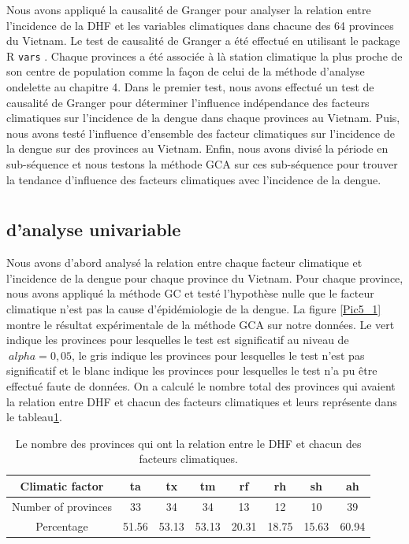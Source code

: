 Nous avons appliqué la causalité de Granger pour analyser la relation entre l'incidence de la DHF et les variables climatiques dans chacune des 64 provinces du Vietnam. Le test de causalité de Granger a été effectué en utilisant le package R \texttt{vars}  \cite{pfaff2013package}. Chaque provinces a été associée à là station climatique la plus proche de son centre de population comme la façon de celui de la méthode d'analyse ondelette au chapitre 4. Dans le premier test, nous avons effectué un test de causalité de Granger pour déterminer l'influence indépendance des facteurs climatiques sur l'incidence de la dengue dans chaque provinces au Vietnam. Puis, nous avons testé l'influence d'ensemble des facteur climatiques sur l'incidence de la dengue sur des provinces au Vietnam. Enfin, nous avons divisé la période en sub-séquence et nous testons la méthode GCA sur ces sub-séquence pour trouver la tendance d'influence des facteurs climatiques avec l'incidence de la dengue. 

\section{\Rs}

\subsection{\Rs d'analyse univariable}
Nous avons d'abord analysé la relation entre chaque facteur climatique et l'incidence de la dengue pour chaque province du Vietnam. Pour chaque province, nous avons appliqué la méthode GC et testé l'hypothèse nulle que le facteur climatique n'est pas la cause d'épidémiologie de la dengue. La figure \ref{Pic5_1} montre le résultat expérimentale de la méthode GCA sur notre données. Le vert indique les provinces pour lesquelles le test est significatif au niveau de $ \ alpha = 0,05 $, le gris indique les provinces pour lesquelles le test n'est pas significatif et le blanc indique les provinces pour lesquelles le test n'a pu être effectué faute de données. On a calculé le nombre total des provinces qui avaient la relation entre DHF et chacun des facteurs climatiques et leurs représente dans le tableau\ref{table1}.

\begin{table}[h]
\centering
\begin{tabular} { | c | c | c | c | c | c | c | c |}
\hline
Climatic factor & ta & tx & tm & rf & rh & sh & ah \\
\hline
Number of provinces & 33 & 34 & 34 & 13 & 12 & 10 & 39 \\
\hline
Percentage & 51.56 & 53.13 & 53.13 & 20.31 & 18.75 & 15.63 & 60.94 \\
\hline
\end{tabular}
\caption{Le nombre des provinces qui ont la relation entre le DHF et chacun des facteurs climatiques.} 
\label{table1}
\end{table}

